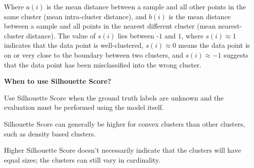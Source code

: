 \begin{center}
\end{center}

Where  $a(i)$ is the mean distance between a sample and all other points in the same cluster (mean intra-cluster distance), 
and  $b(i)$ is the mean distance between a sample and all points in the nearest different cluster (mean nearest-cluster distance). 
The value of  $s(i)$ lies between -$1$ and  $1$, where  $s(i) \approx 1$ indicates that the data point is well-clustered, 
 $s(i) \approx 0$ means the data point is on or very close to the boundary between two clusters, and  $s(i) \approx -1$ 
suggests that the data point has been misclassified into the wrong cluster.

\textbf{When to use Silhouette Score?}

Use Silhouette Score when the ground truth labels are unknown and the evaluation must be performed using the model itself.

{
\item Silhouette Score can generally be higher for convex clusters than other clusters, such as density based clusters.
\item Higher Silhouette Score doesn't necessarily indicate that the clusters will have equal sizes; the clusters can still vary in cardinality. 
}